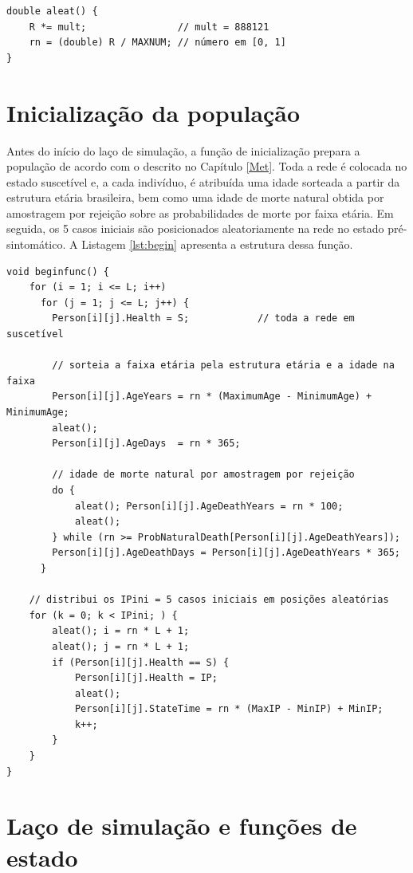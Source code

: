\documentclass[
	12pt,				%
	openright,			%
	oneside,			%
	a4paper,			%
	english,			%
	french,				%
	spanish,			%
	brazil				%
	]{abntex2}
\begin{document}
\begin{lstlisting}[caption={Gerador congruencial linear multiplicativo.}, label={lst:rng}]
double aleat() {
    R *= mult;                // mult = 888121
    rn = (double) R / MAXNUM; // número em [0, 1]
}
\end{lstlisting}

\section{Inicialização da população}

Antes do início do laço de simulação, a função de inicialização prepara a população de acordo com o descrito no Capítulo \ref{Met}. Toda a rede é colocada no estado suscetível e, a cada indivíduo, é atribuída uma idade sorteada a partir da estrutura etária brasileira, bem como uma idade de morte natural obtida por amostragem por rejeição sobre as probabilidades de morte por faixa etária. Em seguida, os 5 casos iniciais são posicionados aleatoriamente na rede no estado pré-sintomático. A Listagem \ref{lst:begin} apresenta a estrutura dessa função.

\begin{lstlisting}[caption={Inicialização da população (\texttt{beginfunc}).}, label={lst:begin}]
void beginfunc() {
    for (i = 1; i <= L; i++)
      for (j = 1; j <= L; j++) {
        Person[i][j].Health = S;            // toda a rede em suscetível

        // sorteia a faixa etária pela estrutura etária e a idade na faixa
        Person[i][j].AgeYears = rn * (MaximumAge - MinimumAge) + MinimumAge;
        aleat();
        Person[i][j].AgeDays  = rn * 365;

        // idade de morte natural por amostragem por rejeição
        do {
            aleat(); Person[i][j].AgeDeathYears = rn * 100;
            aleat();
        } while (rn >= ProbNaturalDeath[Person[i][j].AgeDeathYears]);
        Person[i][j].AgeDeathDays = Person[i][j].AgeDeathYears * 365;
      }

    // distribui os IPini = 5 casos iniciais em posições aleatórias
    for (k = 0; k < IPini; ) {
        aleat(); i = rn * L + 1;
        aleat(); j = rn * L + 1;
        if (Person[i][j].Health == S) {
            Person[i][j].Health = IP;
            aleat();
            Person[i][j].StateTime = rn * (MaxIP - MinIP) + MinIP;
            k++;
        }
    }
}
\end{lstlisting}

\section{Laço de simulação e funções de estado}
\end{document}
